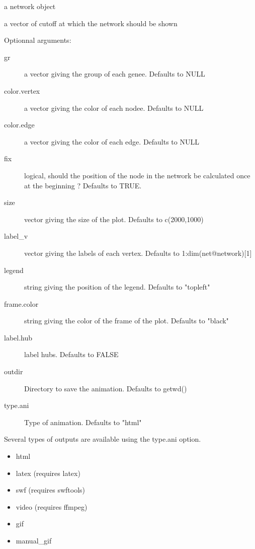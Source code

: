 \documentclass[a4paper]{book}
\begin{document}
\begin{Arguments}
\begin{ldescription}
\item[\code{net}] a network object
\item[\code{list\_nv}] a vector of cutoff at which the network should be shown
\item[\code{...}] Optionnal arguments:
\begin{description}
 \item[gr] a vector giving the group of each genee. Defaults to NULL
\item[color.vertex] a vector giving the color of each nodee. Defaults to NULL
\item[color.edge] a vector giving the color of each edge. Defaults to NULL
\item[fix] logical, should the position of the node in the network be calculated once at the beginning ? Defaults to TRUE.
\item[size] vector giving the size of the plot. Defaults to c(2000,1000)
\item[label\_v] vector giving the labels of each vertex. Defaults to 1:dim(net@network)[1]
\item[legend] string giving the position of the legend. Defaults to "topleft"
\item[frame.color] string giving the color of the frame of the plot. Defaults to "black"
\item[label.hub] label hubs. Defaults to FALSE
\item[outdir] Directory to save the animation. Defaults to getwd()
\item[type.ani] Type of animation. Defaults to "html"

\end{description}

\end{ldescription}
\end{Arguments}
%
\begin{Details}\relax
Several types of outputs are available using the type.ani option.
\begin{itemize}
 
\item html
\item latex (requires latex)
\item swf (requires swftools)
\item video (requires ffmpeg)
\item gif
\item manual\_gif

\end{itemize}

\end{Details}
\end{document}
